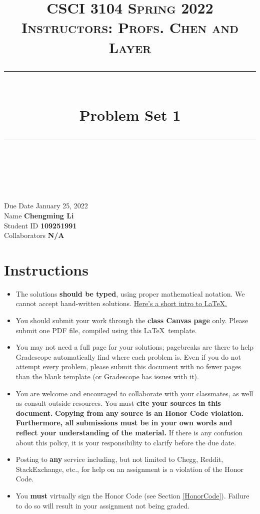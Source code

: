 \documentclass[11pt]{article}
\title{
\normalfont \normalsize 
\textsc{CSCI 3104 Spring 2022 \\ 
Instructors: Profs. Chen and Layer} \\
[10pt] 
\rule{\linewidth}{0.5pt} \\[6pt] 
\huge Problem Set 1 \\
\rule{\linewidth}{2pt}  \\[10pt]
}
\date{}
\theoremstyle{definition}
\theoremstyle{definition}
\theoremstyle{definition}
\begin{document}

\maketitle


\noindent
Due Date \dotfill January 25, 2022 \\
Name \dotfill \textbf{Chengming Li} \\
Student ID \dotfill \textbf{109251991} \\
Collaborators \dotfill \textbf{N/A}

\tableofcontents

\section{Instructions}
 \begin{itemize}
	\item The solutions \textbf{should be typed}, using proper mathematical notation. We cannot accept hand-written solutions. \href{http://ece.uprm.edu/~caceros/latex/introduction.pdf}{Here's a short intro to \LaTeX.}
	\item You should submit your work through the \textbf{class Canvas page} only. Please submit one PDF file, compiled using this \LaTeX \ template.
	\item You may not need a full page for your solutions; pagebreaks are there to help Gradescope automatically find where each problem is. Even if you do not attempt every problem, please submit this document with no fewer pages than the blank template (or Gradescope has issues with it).

	\item You are welcome and encouraged to collaborate with your classmates, as well as consult outside resources. You must \textbf{cite your sources in this document.} \textbf{Copying from any source is an Honor Code violation. Furthermore, all submissions must be in your own words and reflect your understanding of the material.} If there is any confusion about this policy, it is your responsibility to clarify before the due date. 

	\item Posting to \textbf{any} service including, but not limited to Chegg, Reddit, StackExchange, etc., for help on an assignment is a violation of the Honor Code.

	\item You \textbf{must} virtually sign the Honor Code (see Section \ref{HonorCode}). Failure to do so will result in your assignment not being graded.
\end{itemize}
\end{document}
